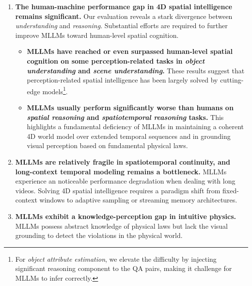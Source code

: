 \documentclass{article}
\begin{document}
\begin{enumerate}
  \item{
    \textbf{
    The human-machine performance gap in 4D spatial intelligence remains significant.} Our evaluation reveals a stark divergence between \textit{understanding} and \textit{reasoning}.
    Substantial efforts are required to further improve MLLMs toward human-level spatial cognition.
    \begin{itemize}
      \item{
    \textbf{MLLMs have reached or even surpassed human-level spatial cognition on some perception-related tasks in \textit{object understanding} and \textit{scene understanding}.} 
    These results suggest that perception-related spatial intelligence has been largely solved by cutting-edge models\footnote{For \textit{object attribute estimation}, we elevate the difficulty by injecting significant reasoning component to the QA pairs, making it challenge for MLLMs to infer correctly.}.
  }
  \item{
    \textbf{MLLMs usually perform significantly worse than humans on \textit{spatial reasoning} and \textit{spatiotemporal reasoning} tasks.}
    This highlights a fundamental deficiency of MLLMs in maintaining a coherent 4D world model over extended temporal sequences and in grounding visual perception based on fundamental physical laws.
    }  
    \end{itemize}
  }
    \item{
    \textbf{MLLMs are relatively fragile in spatiotemporal continuity, and long-context temporal modeling remains a bottleneck.}
    MLLMs experience an noticeable performance degradation when dealing with long videos.
    Solving 4D spatial intelligence requires a paradigm shift from fixed-context windows to adaptive sampling or streaming memory architectures.
    }
    \item{
    \textbf{MLLMs exhibit a knowledge-perception gap in intuitive physics.} MLLMs possess abstract knowledge of physical laws but lack the visual grounding to detect the violations in the physical world.
    }


\end{enumerate}
\end{document}
